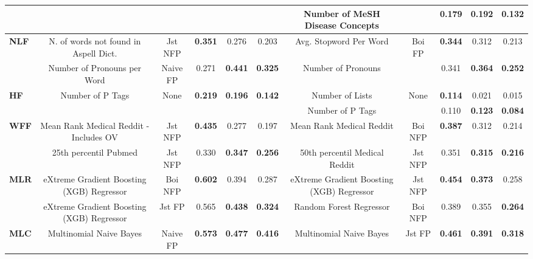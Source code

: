 \begin{table*}[t]
{\begin{tabular}{l|ccccc|ccccc}
 &  &  &  &  &  & Number of MeSH Disease Concepts  &  & 0.179  & \textbf{0.192}  & \textbf{0.132}\tabularnewline
\midrule 
\multirow{2}{*}{\textbf{NLF}} & N. of words not found in Aspell Dict.  & Jst NFP  & \textbf{0.351}  & 0.276  & 0.203 & Avg. Stopword Per Word  & \multirow{2}{*}{Boi FP } & \textbf{0.344}  & 0.312  & 0.213\tabularnewline
 & Number of Pronouns per Word  & Naive FP  & 0.271  & \textbf{0.441}  & \textbf{0.325} & Number of Pronouns  &  & 0.341  & \textbf{0.364}  & \textbf{0.252}\tabularnewline
\midrule 
\multirow{2}{*}{\textbf{HF}} & \multirow{2}{*}{Number of P Tags } & \multirow{2}{*}{None } & \multirow{2}{*}{\textbf{0.219} } & \multirow{2}{*}{\textbf{0.196} } & \multirow{2}{*}{\textbf{0.142}} & Number of Lists  & \multirow{2}{*}{None} & \textbf{0.114}  & 0.021  & 0.015\tabularnewline
 &  &  &  &  &  & Number of P Tags  &  & 0.110  & \textbf{0.123}  & \textbf{0.084}\tabularnewline
\midrule 
\multirow{2}{*}{\textbf{WFF}} & Mean Rank Medical Reddit - Includes OV  & Jst NFP  & \textbf{0.435}  & 0.277  & 0.197 & Mean Rank Medical Reddit  & Boi NFP  & \textbf{0.387}  & 0.312  & 0.214\tabularnewline
 & 25th percentil Pubmed  & Jst NFP  & 0.330  & \textbf{0.347}  & \textbf{0.256} & 50th percentil Medical Reddit  & Jst NFP  & 0.351  & \textbf{0.315}  & \textbf{0.216}\tabularnewline
\midrule 
\multirow{2}{*}{\textbf{MLR}} & eXtreme Gradient Boosting (XGB) Regressor  & Boi NFP  & \textbf{0.602}  & 0.394  & 0.287 & eXtreme Gradient Boosting (XGB) Regressor  & Jst NFP  & \textbf{0.454}  & \textbf{0.373}  & 0.258\tabularnewline
 & eXtreme Gradient Boosting (XGB) Regressor  & Jst FP  & 0.565  & \textbf{0.438}  & \textbf{0.324} & Random Forest Regressor  & Boi NFP  & 0.389  & 0.355  & \textbf{0.264}\tabularnewline
\midrule 
\textbf{MLC} & Multinomial Naive Bayes  & Naive FP  & \textbf{0.573}  & \textbf{0.477}  & \textbf{0.416} & Multinomial Naive Bayes  & Jst FP  & \textbf{0.461}  & \textbf{0.391}  & \textbf{0.318}\tabularnewline
\bottomrule
\end{tabular}
} %
\end{table*}
